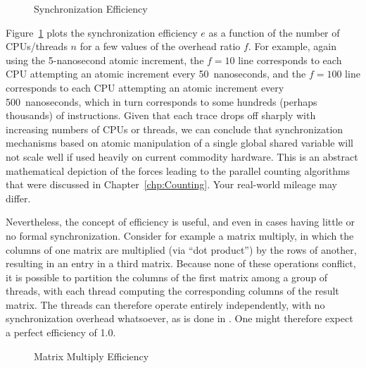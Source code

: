 \begin{figure}[tbp]
\centering
{}
\caption{Synchronization Efficiency}
\label{fig:SMPdesign:Synchronization Efficiency}
\end{figure}

Figure~\ref{fig:SMPdesign:Synchronization Efficiency} plots the synchronization
efficiency $e$ as a function of the number of CPUs/threads $n$ for
a few values of the overhead ratio $f$.
For example, again using the 5-nanosecond atomic increment, the $f=10$
line corresponds to each CPU attempting an atomic increment every
50~nanoseconds, and the $f=100$ line corresponds to each CPU attempting
an atomic increment every 500~nanoseconds, which in turn corresponds to
some hundreds (perhaps thousands) of instructions.
Given that each trace drops off sharply with increasing numbers of
CPUs or threads, we can conclude that
synchronization mechanisms based on
atomic manipulation of a single global shared variable will not
scale well if used heavily on current commodity hardware.
This is an abstract mathematical depiction of the forces leading
to the parallel counting algorithms that were discussed in
Chapter~\ref{chp:Counting}.
Your real-world mileage may differ.

Nevertheless, the concept of efficiency is useful, and even in cases
having little or no formal synchronization.
Consider for example a matrix multiply, in which the columns of one
matrix are multiplied (via ``dot product'') by the rows of another,
resulting in an entry in a third matrix.
Because none of these operations conflict, it is possible to partition
the columns of the first matrix among a group of threads, with each thread
computing the corresponding columns of the result matrix.
The threads can therefore operate entirely independently, with no
synchronization overhead whatsoever, as is done in
.
One might therefore expect a perfect efficiency of 1.0.

\begin{figure}[tbp]
\centering
{}
\caption{Matrix Multiply Efficiency}
\label{fig:SMPdesign:Matrix Multiply Efficiency}
\end{figure}

